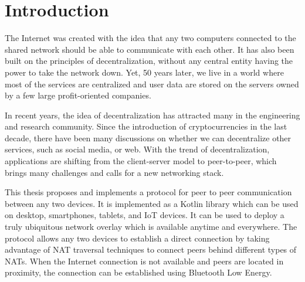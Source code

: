 \chapter{Introduction}


The Internet was created with the idea that any two computers connected to the shared network should be able to communicate with each other. It has also been built on the principles of decentralization, without any central entity having the power to take the network down. Yet, 50 years later, we live in a world where most of the services are centralized and user data are stored on the servers owned by a few large profit-oriented companies.

In recent years, the idea of decentralization has attracted many in the engineering and research community. Since the introduction of cryptocurrencies in the last decade, there have been many discussions on whether we can decentralize other services, such as social media, or web. With the trend of decentralization, applications are shifting from the client-server model to peer-to-peer, which brings many challenges and calls for a new networking stack.


This thesis proposes and implements a protocol for peer to peer communication between any two devices. It is implemented as a Kotlin library which can be used on desktop, smartphones, tablets, and IoT devices. It can be used to deploy a truly ubiquitous network overlay which is available anytime and everywhere. The protocol allows any two devices to establish a direct connection by taking advantage of NAT traversal techniques to connect peers behind different types of NATs. When the Internet connection is not available and peers are located in proximity, the connection can be established using Bluetooth Low Energy.

